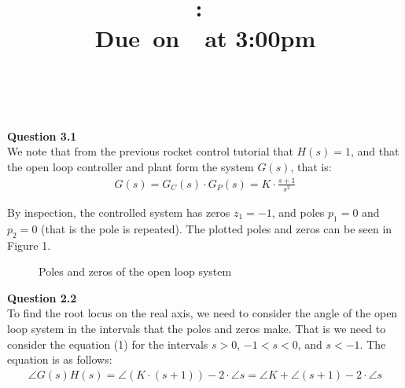 \documentclass{article}
\title{
    \vspace{2in}
    \textmd{\textbf{\hmwkClass:\ \hmwkTitle}}\\
    \normalsize\vspace{0.1in}\small{Due\ on\ \hmwkDueDate\ at 3:00pm}\\
    \vspace{0.1in}\large{\textit{\hmwkClassInstructor\ \hmwkClassTime}}
    \vspace{3in}
}
\author{\textbf{\hmwkAuthorName}}
\date{}
\begin{document}
\maketitle

\pagebreak



    \textbf{Question 3.1}\\
    
    We note that from the previous rocket control tutorial that $H(s) = 1$, and that the open loop controller and plant form the system $G(s)$, that is:
    \begin{align}
	    G(s) = G_C(s) \cdot G_P(s) = K \cdot \frac{s + 1}{s^2}
    \end{align}
    
	By inspection, the controlled system has zeros $z_1 = -1$, and poles $p_1 = 0$ and $p_2 = 0$ (that is the pole is repeated). The plotted poles and zeros can be seen in Figure 1.
	
	\begin{figure}[h]
		\centering
		\caption{Poles and zeros of the open loop system}
	\end{figure}
	

 
    \textbf{Question 2.2}\\
    
    To find the root locus on the real axis, we need to consider the angle of the open loop system in the intervals that the poles and zeros make. That is we need to consider the equation (1) for the intervals $s > 0$, $-1 < s < 0$, and $s < -1$. The equation is as follows:
    \begin{align}
	    \angle G(s)H(s) = \angle (K \cdot (s+1)) - 2 \cdot \angle s =  \angle K + \angle (s+1) - 2 \cdot \angle s
    \end{align}
	
\end{document}
